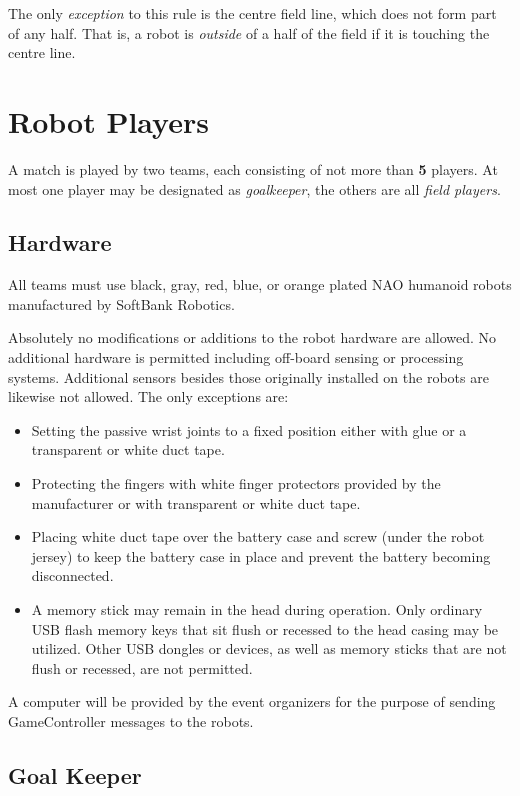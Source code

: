 \documentclass[12pt]{article}
\begin{document}
The only \textit{exception} to this rule is the centre field line, which does not form part of any half.
That is, a robot is \textit{outside} of a half of the field if it is touching the centre line.

\newpage
\section{Robot Players}
\label{sec:robot_players}
A match is played by two teams, each consisting of not more than \textbf{5} players. At most one player may be designated as \emph{goalkeeper}, the others are all \emph{field players}.

\subsection{Hardware}
\label{sec:hardware}
All teams must use black, gray, red, blue, or orange plated NAO humanoid robots manufactured by SoftBank Robotics.

Absolutely no modifications or additions to the robot hardware are allowed. No additional hardware is permitted including off-board sensing or processing systems. Additional sensors besides those originally installed on the robots are likewise not allowed. The only exceptions are:

\begin{itemize}
    \item Setting the passive wrist joints to a fixed position either with glue or a transparent or white duct tape.
    \item Protecting the fingers with white finger protectors provided by the manufacturer or with transparent or white duct tape.
    \item Placing white duct tape over the battery case and screw (under the robot jersey) to keep the battery case in place and prevent the battery becoming disconnected.
    \item A memory stick may remain in the head during operation.  Only ordinary USB flash memory keys that sit flush or recessed to the head casing may be utilized. Other USB dongles or devices, as well as memory sticks that are not flush or recessed, are not permitted.
\end{itemize}

A computer will be provided by the event organizers for the purpose of sending GameController messages to the robots.

\subsection{Goal Keeper}
\label{sec:goal_keeper}
\end{document}
